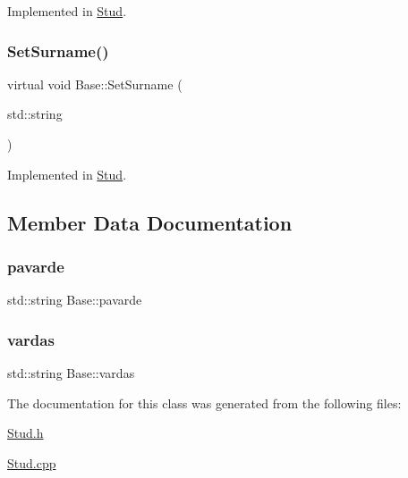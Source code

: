 Implemented in \mbox{\hyperlink{class_stud_a47072e741fc0f089a5412e0a0b74c2a2}{Stud}}.

\mbox{\label{class_base_aa096e05aae5778d7ebb03a8b6f775e33}} 
\subsubsection{\texorpdfstring{SetSurname()}{SetSurname()}}
{\footnotesize\ttfamily virtual void Base\+::\+Set\+Surname (\begin{DoxyParamCaption}\item[{std\+::string}]{ }\end{DoxyParamCaption})\hspace{0.3cm}{\ttfamily [pure virtual]}}



Implemented in \mbox{\hyperlink{class_stud_aaf24cd5a22fea522b6f9da7e3a994d99}{Stud}}.



\subsection{Member Data Documentation}
\mbox{\label{class_base_a9a28bad028def844ddb5694d106e65a5}} 
\subsubsection{\texorpdfstring{pavarde}{pavarde}}
{\footnotesize\ttfamily std\+::string Base\+::pavarde\hspace{0.3cm}{\ttfamily [protected]}}

\mbox{\label{class_base_a2a75481faea6ee33c342014782f239ae}} 
\subsubsection{\texorpdfstring{vardas}{vardas}}
{\footnotesize\ttfamily std\+::string Base\+::vardas\hspace{0.3cm}{\ttfamily [protected]}}



The documentation for this class was generated from the following files\+:\begin{DoxyCompactItemize}
\item 
\mbox{\hyperlink{_stud_8h}{Stud.\+h}}\item 
\mbox{\hyperlink{_stud_8cpp}{Stud.\+cpp}}\end{DoxyCompactItemize}
